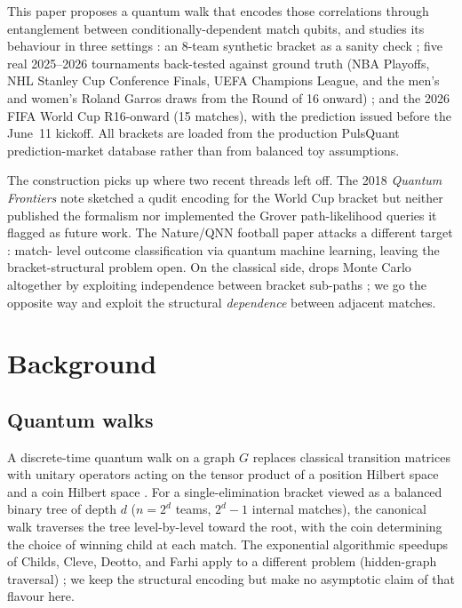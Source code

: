 \documentclass[11pt]{article}
\begin{document}
This paper proposes a quantum walk that encodes those correlations
through entanglement between conditionally-dependent match qubits,
and studies its behaviour in three settings : an 8-team synthetic
bracket as a sanity check ; five real 2025--2026 tournaments
back-tested against ground truth (NBA Playoffs, NHL Stanley Cup
Conference Finals, UEFA Champions League, and the men's and women's
Roland Garros draws from the Round of 16 onward) ; and the 2026 FIFA
World Cup R16-onward (15 matches), with the prediction issued before
the June~11 kickoff. All brackets are loaded from the production
PulsQuant prediction-market database rather than from balanced
toy assumptions.

The construction picks up where two recent threads left off. The
2018 \emph{Quantum Frontiers} note \cite{quantumfrontiers_wc_2018}
sketched a qudit encoding for the World Cup bracket but neither
published the formalism nor implemented the Grover path-likelihood
queries it flagged as future work. The Nature/QNN football paper
\cite{nature_qnn_football_2025} attacks a different target : match-
level outcome classification via quantum machine learning, leaving
the bracket-structural problem open. On the classical side,
\cite{brandes2025stop} drops Monte Carlo altogether by exploiting
independence between bracket sub-paths ; we go the opposite way and
exploit the structural \emph{dependence} between adjacent matches.

\section{Background}
\label{sec:bg}

\subsection{Quantum walks}

A discrete-time quantum walk on a graph $G$ replaces classical
transition matrices with unitary operators acting on the tensor
product of a position Hilbert space and a coin Hilbert space
\cite{aharonov1993quantum, kempe2003quantum, portugal2018quantum}.
For a single-elimination bracket viewed as a balanced binary tree
of depth $d$ ($n = 2^d$ teams, $2^d - 1$ internal matches), the
canonical walk traverses the tree level-by-level toward the root,
with the coin determining the choice of winning child at each
match. The exponential algorithmic speedups of Childs, Cleve,
Deotto, and Farhi \cite{childs2003exponential} apply to a different
problem (hidden-graph traversal) ; we keep the structural encoding
but make no asymptotic claim of that flavour here.
\end{document}
